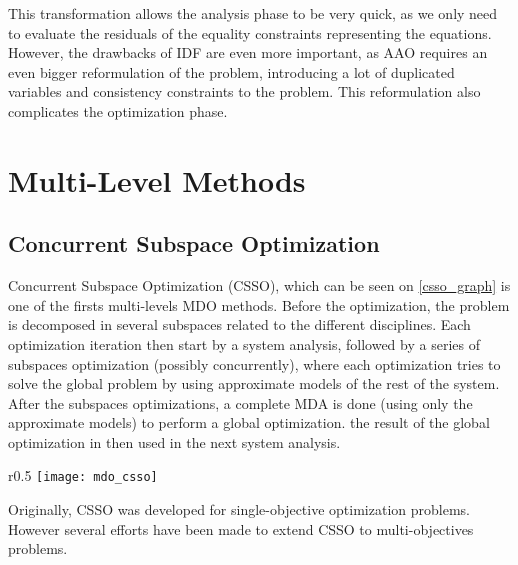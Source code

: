 This transformation allows the analysis phase to be very quick, as we only need to evaluate the residuals of the equality constraints representing the equations.
However, the drawbacks of IDF are even more important, as AAO requires an even bigger reformulation of the problem, introducing a lot of duplicated variables and consistency  constraints to the problem. This reformulation also complicates the optimization phase.



\section{Multi-Level Methods}

\subsection{Concurrent Subspace Optimization}

Concurrent Subspace Optimization (CSSO), which can be seen on \figurename{} \ref{csso_graph} is one of the firsts multi-levels MDO methods. Before the optimization, the problem is decomposed in several subspaces related to the different disciplines. Each optimization iteration then start by a system analysis, followed by a series of subspaces optimization (possibly concurrently), where each optimization tries to solve the global problem by using approximate models of the rest of the system. After the subspaces optimizations, a complete MDA is done (using only the approximate models) to perform a global optimization. the result of the global optimization in then used in the next system analysis.

\begin{wrapfigure}{r}{0.5\textwidth}
\centering
\texttt{[image: mdo\_csso]}
\caption{CSSO method}\label{csso_graph}
\end{wrapfigure}

Originally, CSSO was developed for single-objective optimization problems. However several efforts have been made to extend CSSO to multi-objectives problems.

